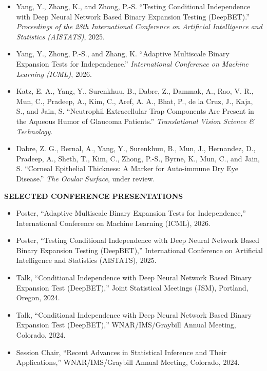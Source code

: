 \documentclass[12pt,reqno,oneside]{amsbook}
\theoremstyle{definition}
\theoremstyle{remark}
\begin{document}
\begin{itemize}

    \item Yang, Y., Zhang, K., and Zhong, P.-S.
    ``Testing Conditional Independence with Deep Neural Network Based
    Binary Expansion Testing (DeepBET).''
    \textit{Proceedings of the 28th International Conference on
    Artificial Intelligence and Statistics (AISTATS)}, 2025.

    \item Yang, Y., Zhong, P.-S., and Zhang, K.
    ``Adaptive Multiscale Binary Expansion Tests for Independence.''
    \textit{International Conference on Machine Learning (ICML)}, 2026.

    \item Katz, E. A., Yang, Y., Surenkhuu, B., Dabre, Z., Dammak, A.,
    Rao, V. R., Mun, C., Pradeep, A., Kim, C., Aref, A. A., Bhat, P.,
    de la Cruz, J., Kaja, S., and Jain, S.
    ``Neutrophil Extracellular Trap Components Are Present in the
    Aqueous Humor of Glaucoma Patients.''
    \textit{Translational Vision Science \& Technology}.

    \item Dabre, Z. G., Bernal, A., Yang, Y., Surenkhuu, B., Mun, J.,
    Hernandez, D., Pradeep, A., Sheth, T., Kim, C., Zhong, P.-S.,
    Byrne, K., Mun, C., and Jain, S.
    ``Corneal Epithelial Thickness: A Marker for Auto-immune Dry Eye Disease.''
    \textit{The Ocular Surface}, under review.

\end{itemize}



\vspace{0.3cm}

\noindent
\textbf{SELECTED CONFERENCE PRESENTATIONS}

\begin{itemize}

    \item Poster, ``Adaptive Multiscale Binary Expansion Tests for
    Independence,'' International Conference on Machine Learning
    (ICML), 2026.

    \item Poster, ``Testing Conditional Independence with Deep Neural
    Network Based Binary Expansion Testing (DeepBET),''
    International Conference on Artificial Intelligence and Statistics
    (AISTATS), 2025.

    \item Talk, ``Conditional Independence with Deep Neural Network
    Based Binary Expansion Test (DeepBET),''
    Joint Statistical Meetings (JSM), Portland, Oregon, 2024.

    \item Talk, ``Conditional Independence with Deep Neural Network
    Based Binary Expansion Test (DeepBET),''
    WNAR/IMS/Graybill Annual Meeting, Colorado, 2024.

    \item Session Chair, ``Recent Advances in Statistical Inference
    and Their Applications,'' WNAR/IMS/Graybill Annual Meeting,
    Colorado, 2024.

\end{itemize}
\end{document}
